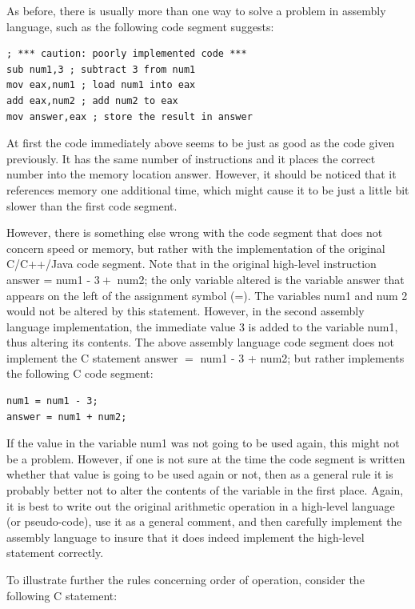 \documentclass[10pt]{book}
\begin{document}
As before, there is usually more than one way to solve a problem in assembly language, such as the following code segment suggests:

\begin{verbatim}
; *** caution: poorly implemented code ***
sub num1,3 ; subtract 3 from num1
mov eax,num1 ; load num1 into eax
add eax,num2 ; add num2 to eax
mov answer,eax ; store the result in answer
\end{verbatim}

At first the code immediately above seems to be just as good as the code given previously. It has the same number of instructions and it places the correct number into the memory location answer. However, it should be noticed that it references memory one additional time, which might cause it to be just a little bit slower than the first code segment.

However, there is something else wrong with the code segment that does not concern speed or memory, but rather with the implementation of the original C/C++/Java code segment. Note that in the original high-level instruction answer = num1 - $3+$ num2; the only variable altered is the variable answer that appears on the left of the assignment symbol (=). The variables num1 and num 2 would not be altered by this statement. However, in the second assembly language implementation, the immediate value 3 is added to the variable num1, thus altering its contents. The above assembly language code segment does not implement the C statement answer $=$ num1 - 3 + num2; but rather implements the following C code segment:

\begin{verbatim}
num1 = num1 - 3;
answer = num1 + num2;
\end{verbatim}

If the value in the variable num1 was not going to be used again, this might not be a problem. However, if one is not sure at the time the code segment is written whether that value is going to be used again or not, then as a general rule it is probably better not to alter the contents of the variable in the first place. Again, it is best to write out the original arithmetic operation in a high-level language (or pseudo-code), use it as a general comment, and then carefully implement the assembly language to insure that it does indeed implement the high-level statement correctly.

To illustrate further the rules concerning order of operation, consider the following C statement:
\end{document}
